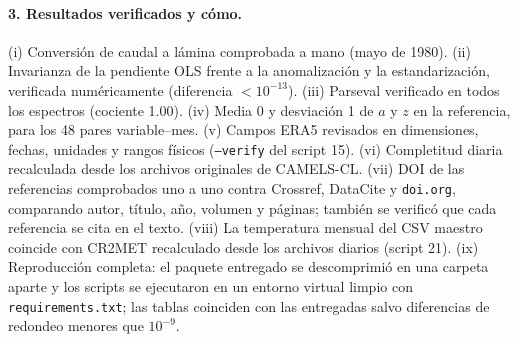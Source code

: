 \documentclass[11pt,a4paper]{article}
\newcommand{\archivo}[1]{\nolinkurl{#1}}
\begin{document}
\paragraph{3. Resultados verificados y cómo.} (i) Conversión de caudal a lámina comprobada a mano (mayo de 1980). (ii) Invarianza de la pendiente OLS frente a la anomalización y la estandarización, verificada numéricamente (diferencia $<10^{-13}$). (iii) Parseval verificado en todos los espectros (cociente 1.00). (iv) Media 0 y desviación 1 de $a$ y $z$ en la referencia, para los 48 pares variable--mes. (v) Campos ERA5 revisados en dimensiones, fechas, unidades y rangos físicos (\texttt{--verify} del script 15). (vi) Completitud diaria recalculada desde los archivos originales de CAMELS-CL. (vii) DOI de las referencias comprobados uno a uno contra Crossref, DataCite y \texttt{doi.org}, comparando autor, título, año, volumen y páginas; también se verificó que cada referencia se cita en el texto. (viii) La temperatura mensual del CSV maestro coincide con CR2MET recalculado desde los archivos diarios (script 21). (ix) Reproducción completa: el paquete entregado se descomprimió en una carpeta aparte y los scripts se ejecutaron en un entorno virtual limpio con \archivo{requirements.txt}; las tablas coinciden con las entregadas salvo diferencias de redondeo menores que $10^{-9}$.
\end{document}
